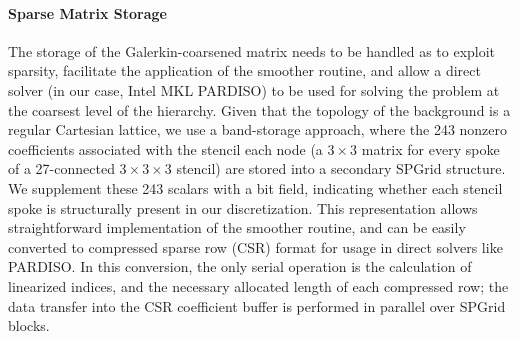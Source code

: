 \paragraph{Sparse Matrix Storage} The storage of the Galerkin-coarsened matrix needs to be handled as to exploit sparsity, facilitate the application of the smoother routine,
and allow a direct solver (in our case, Intel MKL PARDISO) to be used for solving the problem at the coarsest level of the hierarchy. Given that the topology of the background is a regular
Cartesian lattice, we use a band-storage approach, where the 243 nonzero coefficients associated with the stencil each node (a $3\times 3$ matrix for every spoke of a 27-connected
$3\times 3\times 3$ stencil) are stored into a secondary SPGrid structure. We supplement these 243 scalars with a bit field,
indicating whether each stencil spoke is structurally present in our discretization. This representation allows straightforward implementation of the smoother routine, and can be easily
converted to compressed sparse row (CSR) format for usage in direct solvers like PARDISO. In this conversion, the only serial operation is the calculation of linearized indices, and the necessary
allocated length of each compressed row; the data transfer into the CSR coefficient buffer is performed in parallel over SPGrid blocks.

